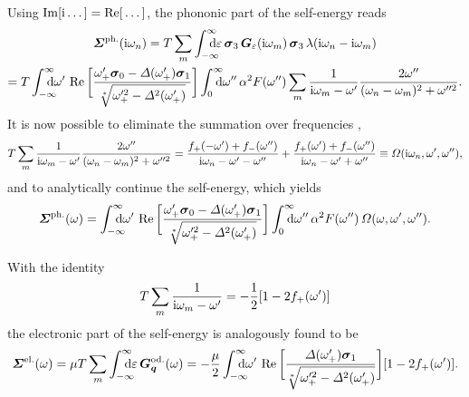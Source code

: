 Using $\operatorname{Im}[\mathrm i \dots] = \operatorname{Re}[\,\dots]$, the phononic part of the self-energy reads
%
\begin{multline*}
    \vec \Sigma \super{ph.} (\I \omega_n)
    = T \sum_m \int \from{-\infty} \till \infty \D \epsilon \,
    \vec \sigma_3 \, \vec G_\epsilon(\I \omega_m) \, \vec \sigma_3 \,
    \lambda(\I \omega_n - \I \omega_m)
    \\
    = T \int \from{-\infty} \till \infty \D \omega' \, \Re \bigg[ \frac
        {\omega'_+ \vec \sigma_0 - \Delta(\omega'_+) \vec \sigma_1}
        {\sqrt[*]{\omega'^2_+ - \Delta^2(\omega'_+)}}
    \bigg]
    \int \from 0 \till \infty \D \omega'' \, \alpha^2 F(\omega'')
    \sum_m \frac 1 {\I \omega_m - \omega'}
    \frac{2 \omega''}{(\omega_n - \omega_m)^2 + \omega''^2}.
\end{multline*}
%
It is now possible to eliminate the summation over  frequencies
\cite[Eqs.~3.40, 3.41]{AllenMitrovic82},
%
\begin{equation*}
    T \sum_m \frac 1 {\mathrm i \omega_m - \omega'}
    \frac{2 \omega''}{(\omega_n - \omega_m)^2 + \omega''^2}
    = \frac{f_+(-\omega') + f_-(\omega'')}{\mathrm i \omega_n - \omega' - \omega''}
    + \frac{f_+( \omega') + f_-(\omega'')}{\mathrm i \omega_n - \omega' + \omega''}
    \equiv \varOmega(\mathrm i \omega_n, \omega', \omega''),
\end{equation*}
%
and to analytically continue the self-energy, which yields
%
\begin{equation*}
    \vec \Sigma \super{ph.} (\omega) =
    \int \from{-\infty} \till \infty \D \omega' \,
    \Re \bigg[ \frac
        {\omega'_+ \vec \sigma_0 - \Delta(\omega'_+) \vec \sigma_1}
        {\sqrt[*]{\omega'^2_+ - \Delta^2(\omega'_+)}}
    \bigg]
    \int \from 0 \till \infty \D \omega'' \, \alpha^2 F(\omega'') \,
    \Omega(\omega, \omega', \omega'').
\end{equation*}

With the identity \cite[Eq.~12.4]{AllenMitrovic82}
%
\begin{equation} \label{Matsubara sum}
    T \sum_m \frac 1 {\mathrm i \omega_m - \omega'} = -\frac 1 2 [1 - 2 f_+(\omega')]
\end{equation}
%
the electronic part of the self-energy is analogously found to be
%
\begin{align*}
    \vec \Sigma \super{el.} (\omega)
    = \mu T \sum_{m} \int \from{-\infty} \till \infty \D \epsilon \,
    \vec G_{\vec q} \super{od.} (\omega)
    = -\frac \mu 2 \int \from{-\infty} \till \infty \D \omega' \,
    \Re \bigg[ \frac
        {\Delta(\omega'_+) \vec \sigma_1}
        {\sqrt[*]{\omega'^2_+ - \Delta^2(\omega'_+)}}
    \bigg] [1 - 2 f_+(\omega')].
\end{align*}

